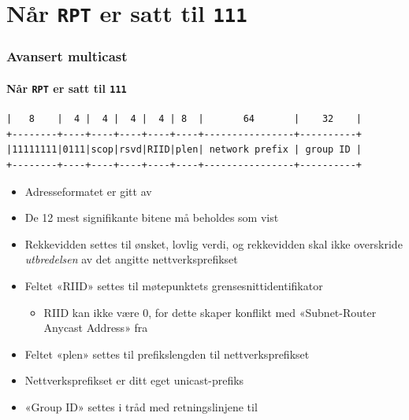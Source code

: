 \section{Når \texttt{RPT} er satt til \texttt{111}}
\begin{frame}[fragile]%
  \frametitle{Avansert multicast}
  \framesubtitle{Når \texttt{RPT} er satt til \texttt{111}}
  \pause
\begin{Verbatim}[fontsize=\tiny]
|   8    |  4 |  4 |  4 |  4 | 8  |       64       |    32    |
+--------+----+----+----+----+----+----------------+----------+
|11111111|0111|scop|rsvd|RIID|plen| network prefix | group ID |
+--------+----+----+----+----+----+----------------+----------+
\end{Verbatim}
  \pause
  \begin{itemize}[<+->]
  \item Adresseformatet er gitt av 
  \item De 12 mest signifikante bitene må beholdes som vist
  \item Rekkevidden settes til ønsket, lovlig verdi, og rekkevidden
    skal ikke overskride \textit{utbredelsen\/} av det angitte
    nettverksprefikset
  \item Feltet «RIID» settes til møtepunktets grensesnittidentifikator
    \begin{itemize}[<+->]
    \item RIID kan ikke være $0$, for dette skaper konflikt med
      «Subnet-Router Anycast Address» fra 
    \end{itemize}
  \item Feltet «plen» settes til prefikslengden til nettverksprefikset
  \item Nettverksprefikset er ditt eget unicast-prefiks
  \item «Group ID» settes i tråd med retningslinjene til 
  \end{itemize}
\end{frame}

